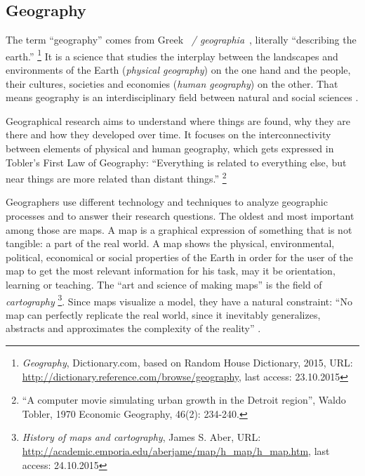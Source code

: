 
\subsection{Geography} %
\label{sub:geography}


The term ``geography'' comes from Greek ~\emph{\textgamma\textepsilon\textomega\textgamma\textrho\textalpha\textphi\textiota\textalpha / geographia}~, literally ``describing the earth.''
\footnote{
  \emph{Geography},
  Dictionary.com, based on Random House Dictionary, 2015,
  URL: \url{http://dictionary.reference.com/browse/geography},
  last access: 23.10.2015
}
It is a science that studies the interplay between the landscapes and environments of the Earth (\emph{physical geography}) on the one hand and the people, their cultures, societies and economies (\emph{human geography}) on the other. That means geography is an interdisciplinary field between natural and social sciences
\cite{rgsGeography}.

Geographical research aims to understand where things are found, why they are there and how they developed over time.
It focuses on the interconnectivity between elements of physical and human geography, which gets expressed in Tobler's First Law of Geography: ``Everything is related to everything else, but near things are more related than distant things.''
\footnote{
  ``A computer movie simulating urban growth in the Detroit region'',
  Waldo Tobler, 1970
  Economic Geography, 46(2): 234-240.
}

Geographers use different technology and techniques to analyze geographic processes and to answer their research questions. The oldest and most important among those are maps. A map is a graphical expression of something that is not tangible: a part of the real world. A map shows the physical, environmental, political, economical or social properties of the Earth in order for the user of the map to get the most relevant information for his task, may it be orientation, learning or teaching. The ``art and science of making maps'' is the field of \emph{cartography}
\footnote{
  \emph{History of maps and cartography},
  James S. Aber,
  URL: \url{http://academic.emporia.edu/aberjame/map/h_map/h_map.htm},
  last access: 24.10.2015
}. Since maps visualize a model, they have a natural constraint: ``No map can perfectly replicate the real world, since it inevitably generalizes, abstracts and approximates the complexity of the reality''
\cite[p. 181]{knowles2008placing}.

